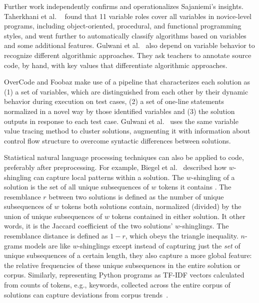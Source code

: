 Further work independently confirms and operationalizes Sajaniemi's insights. Taherkhani et al. ~\cite{taherkhani2010recognizing} found that 11 variable roles cover all variables in novice-level programs, including object-oriented, procedural, and functional programming styles, and went further to automatically classify algorithms based on variables and some additional features. Gulwani et al.~\cite{gulwani_fse14} also depend on variable behavior to recognize different algorithmic approaches. They ask teachers to annotate source code, by hand, with key values that differentiate algorithmic approaches. %

OverCode and Foobaz make use of a pipeline that characterizes each solution as (1) a set of variables, which are distinguished from each other by their dynamic behavior during execution on test cases, (2) a set of one-line statements normalized in a novel way by those identified variables and (3) the solution outputs in response to each test case. Gulwani et al.~\cite{gulwani2016automated} uses the same variable value tracing method to cluster solutions, augmenting it with information about control flow structure to overcome syntactic differences between solutions.



Statistical natural language processing techniques can also be applied to code, preferably after preprocessing. For example, Biegel et al.~\cite{Biegel} described how $w$-shingling can capture local patterns within a solution. The $w$-shingling of a solution is the set of all unique subsequences of $w$ tokens it contains \cite{BRODER19971157}. The resemblance $r$ between two solutions is defined as the number of unique subsequences of $w$ tokens both solutions contain, normalized (divided) by the union of unique subsequences of $w$ tokens contained in either solution. It other words, it is the Jaccard coefficient of the two solutions' $w$-shinglings. The resemblance distance is defined as $1-r$, which obeys the triangle inequality. $n$-grams models are like $w$-shinglings except instead of capturing just the {\it set} of unique subsequences of a certain length, they also capture a more global feature: the relative frequencies of these unique subsequences in the entire solution or corpus. Similarly, representing Python programs as TF-IDF vectors calculated from counts of tokens, e.g., keywords, collected across the entire corpus of solutions can capture deviations from corpus trends~\cite{Gaudencio}.

